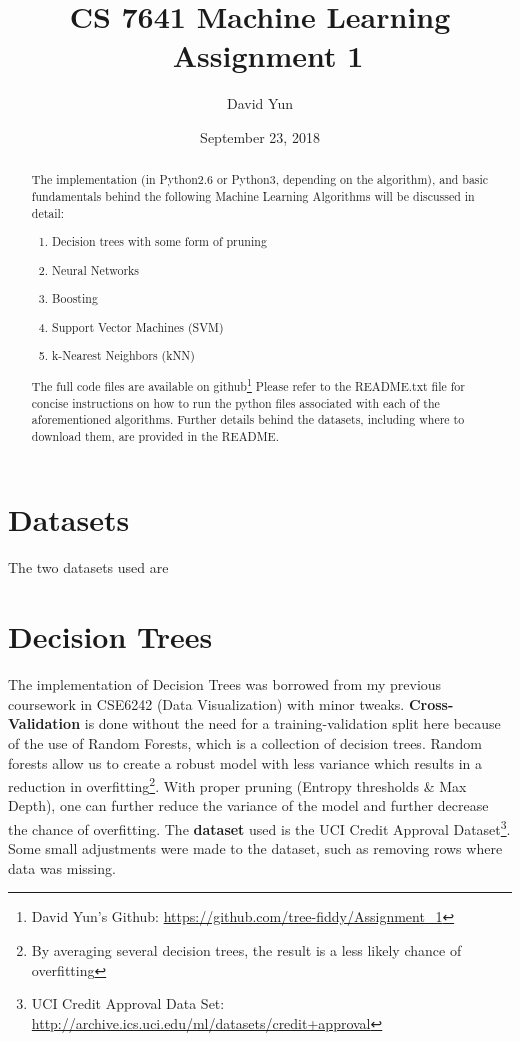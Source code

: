 \documentclass[letterpaper,12pt]{article}
\begin{document}
\title{CS 7641 Machine Learning \\
		\ Assignment 1 }
\author{David Yun}
\date{September 23, 2018}
\maketitle

\begin{abstract}
  The implementation (in Python2.6 or Python3, depending on the algorithm), and basic fundamentals behind the following Machine Learning Algorithms will be discussed in detail:  
  \begin{enumerate}
    \item Decision trees with some form of pruning
    \item Neural Networks
    \item Boosting
    \item Support Vector Machines (SVM)
    \item k-Nearest Neighbors (kNN)
      
    \end{enumerate}

    The full code files are available on github\footnote{David Yun's Github: \url{https://github.com/tree-fiddy/Assignment_1}}
    Please refer to the README.txt file for concise instructions on how to run the python files associated with each of the aforementioned algorithms.  Further details behind the datasets, including where to download them, are provided in the README.  

\end{abstract}

\tableofcontents

\section{Datasets}
The two datasets used are 

\section{Decision Trees}

The implementation of Decision Trees was borrowed from my previous coursework in CSE6242 (Data Visualization) with minor tweaks.
\textbf{Cross-Validation} is done without the need for a training-validation split here because of the use of Random Forests, which is a collection of decision trees.  Random forests allow us to create a robust model with less variance which results in a reduction in overfitting\footnote{By averaging several decision trees, the result is a less likely chance of overfitting}.  With proper pruning (Entropy thresholds \& Max Depth), one can further reduce the variance of the model and further decrease the chance of overfitting.  The \textbf{dataset} used is the UCI Credit Approval Dataset\footnote{UCI Credit Approval Data Set: \url{http://archive.ics.uci.edu/ml/datasets/credit+approval}}.  Some small adjustments were made to the dataset, such as removing rows where data was missing.  
\end{document}
